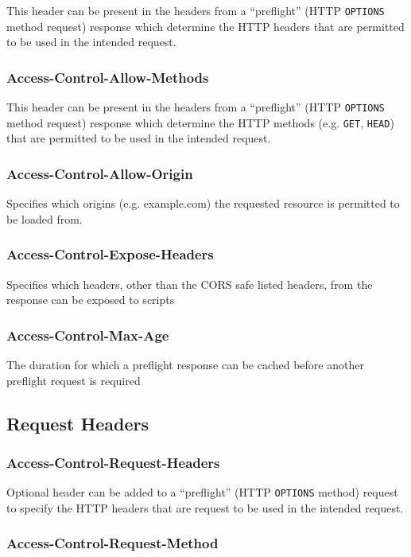 \documentclass{mscreport}
\begin{document}
This header can be present in the headers from a ``preflight'' (HTTP \texttt{OPTIONS} method request) response which determine the HTTP headers that are permitted to be used in the intended request.

\subsubsection{Access-Control-Allow-Methods}

This header can be present in the headers from a ``preflight'' (HTTP \texttt{OPTIONS} method request) response which determine the HTTP methods (e.g. \texttt{GET}, \texttt{HEAD}) that are permitted to be used in the intended request.

\subsubsection{Access-Control-Allow-Origin}

Specifies which origins (e.g. example.com) the requested resource is permitted to be loaded from.

\subsubsection{Access-Control-Expose-Headers}

Specifies which headers, other than the CORS safe listed headers, from the response can be exposed to scripts

\subsubsection{Access-Control-Max-Age}

The duration for which a preflight response can be cached before another preflight request is required

\subsection{Request Headers}
\subsubsection{Access-Control-Request-Headers}

Optional header can be added to a ``preflight'' (HTTP \texttt{OPTIONS} method) request to specify the HTTP headers that are request to be used in the intended request.

\subsubsection{Access-Control-Request-Method}
\end{document}
